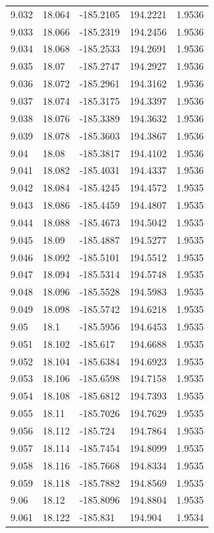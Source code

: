 \begin{tabular}{lllll}
9.032 & 18.064 & -185.2105 & 194.2221 & 1.9536 \\
9.033 & 18.066 & -185.2319 & 194.2456 & 1.9536 \\
9.034 & 18.068 & -185.2533 & 194.2691 & 1.9536 \\
9.035 & 18.07 & -185.2747 & 194.2927 & 1.9536 \\
9.036 & 18.072 & -185.2961 & 194.3162 & 1.9536 \\
9.037 & 18.074 & -185.3175 & 194.3397 & 1.9536 \\
9.038 & 18.076 & -185.3389 & 194.3632 & 1.9536 \\
9.039 & 18.078 & -185.3603 & 194.3867 & 1.9536 \\
9.04 & 18.08 & -185.3817 & 194.4102 & 1.9536 \\
9.041 & 18.082 & -185.4031 & 194.4337 & 1.9536 \\
9.042 & 18.084 & -185.4245 & 194.4572 & 1.9535 \\
9.043 & 18.086 & -185.4459 & 194.4807 & 1.9535 \\
9.044 & 18.088 & -185.4673 & 194.5042 & 1.9535 \\
9.045 & 18.09 & -185.4887 & 194.5277 & 1.9535 \\
9.046 & 18.092 & -185.5101 & 194.5512 & 1.9535 \\
9.047 & 18.094 & -185.5314 & 194.5748 & 1.9535 \\
9.048 & 18.096 & -185.5528 & 194.5983 & 1.9535 \\
9.049 & 18.098 & -185.5742 & 194.6218 & 1.9535 \\
9.05 & 18.1 & -185.5956 & 194.6453 & 1.9535 \\
9.051 & 18.102 & -185.617 & 194.6688 & 1.9535 \\
9.052 & 18.104 & -185.6384 & 194.6923 & 1.9535 \\
9.053 & 18.106 & -185.6598 & 194.7158 & 1.9535 \\
9.054 & 18.108 & -185.6812 & 194.7393 & 1.9535 \\
9.055 & 18.11 & -185.7026 & 194.7629 & 1.9535 \\
9.056 & 18.112 & -185.724 & 194.7864 & 1.9535 \\
9.057 & 18.114 & -185.7454 & 194.8099 & 1.9535 \\
9.058 & 18.116 & -185.7668 & 194.8334 & 1.9535 \\
9.059 & 18.118 & -185.7882 & 194.8569 & 1.9535 \\
9.06 & 18.12 & -185.8096 & 194.8804 & 1.9535 \\
9.061 & 18.122 & -185.831 & 194.904 & 1.9534 \\

\end{tabular}

